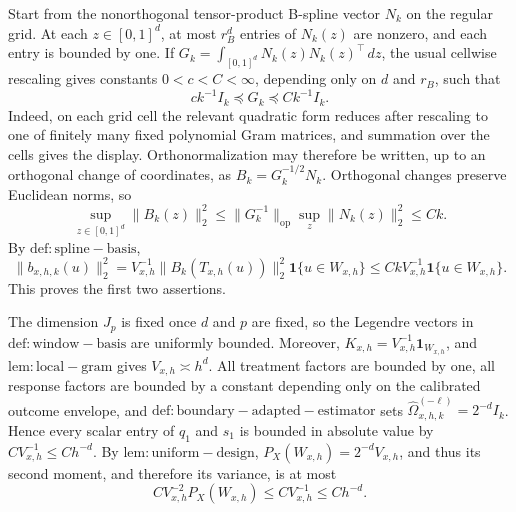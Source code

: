Start from the nonorthogonal tensor-product B-spline vector \(N_k\) on the regular grid. At each \(z\in[0,1]^d\), at most \(r_B^d\) entries of \(N_k(z)\) are nonzero, and each entry is bounded by one. If \(G_k=\int_{[0,1]^d}N_k(z)N_k(z)^\top\,dz\), the usual cellwise rescaling gives constants \(0<c<C<\infty\), depending only on \(d\) and \(r_B\), such that
\[
 c k^{-1}I_k\preceq G_k\preceq C k^{-1}I_k.
\]
Indeed, on each grid cell the relevant quadratic form reduces after rescaling to one of finitely many fixed polynomial Gram matrices, and summation over the cells gives the display. Orthonormalization may therefore be written, up to an orthogonal change of coordinates, as \(B_k=G_k^{-1/2}N_k\). Orthogonal changes preserve Euclidean norms, so
\[
 \sup_{z\in[0,1]^d}\|B_k(z)\|_2^2
 \le \|G_k^{-1}\|_{\mathrm{op}}\sup_z\|N_k(z)\|_2^2
 \le Ck.
\]
By \(\mathrm{def:spline-basis}\),
\[
 \|b_{x,h,k}(u)\|_2^2
 =V_{x,h}^{-1}\|B_k(T_{x,h}(u))\|_2^2
 \mathbf 1\{u\in W_{x,h}\}
 \le CkV_{x,h}^{-1}\mathbf 1\{u\in W_{x,h}\}.
\]
This proves the first two assertions.

The dimension \(J_p\) is fixed once \(d\) and \(p\) are fixed, so the Legendre vectors in \(\mathrm{def:window-basis}\) are uniformly bounded. Moreover, \(K_{x,h}=V_{x,h}^{-1}\mathbf 1_{W_{x,h}}\), and \(\mathrm{lem:local-gram}\) gives \(V_{x,h}\asymp h^d\). All treatment factors are bounded by one, all response factors are bounded by a constant depending only on the calibrated outcome envelope, and \(\mathrm{def:boundary-adapted-estimator}\) sets \(\widehat\Omega_{x,h,k}^{(-\ell)}=2^{-d}I_k\). Hence every scalar entry of \(q_1\) and \(s_1\) is bounded in absolute value by \(CV_{x,h}^{-1}\le Ch^{-d}\). By \(\mathrm{lem:uniform-design}\), \(P_X(W_{x,h})=2^{-d}V_{x,h}\), and thus its second moment, and therefore its variance, is at most
\[
 C V_{x,h}^{-2}P_X(W_{x,h})
 \le C V_{x,h}^{-1}
 \le Ch^{-d}.
\]

